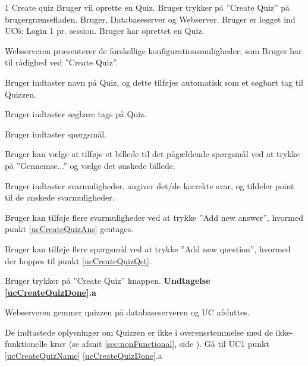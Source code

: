 
\uchead
	{1}
	{Create quiz}
	{Bruger vil oprette en Quiz.}
	{Bruger trykker på ''Create Quiz'' på brugergrænsefladen.}
	{Bruger, Databaseserver og Webserver.}
	{Bruger er logget ind} %
	{UC6: Login}
	{1 pr. session.}
	{Bruger har oprettet en Quiz.}

\item Webserveren præsenterer de forskellige konfigurationsmuligheder, som Bruger har til rådighed ved ''Create Quiz''.

\item \label{ucCreateQuizName} Bruger indtaster navn på Quiz, og dette tilføjes automatisk som et søgbart tag til Quizzen.

\item Bruger indtaster søgbare tags på Quiz.

\item \label{ucCreateQuizQst} Bruger indtaster spørgsmål.

\item Bruger kan vælge at tilføje et billede til det pågældende spørgsmål ved at trykke på ''Gennemse...'' og vælge det ønskede billede.

\item \label{ucCreateQuizAns} Bruger indtaster svarmuligheder, angiver det/de korrekte svar, og tildeler point til de ønskede svarmuligheder.

\item Bruger kan tilføje flere svarmuligheder ved at trykke ''Add new answer'', hvormed punkt \ref{ucCreateQuizAns} gentages.

\item Bruger kan tilføje flere spørgsmål ved at trykke ''Add new question'', hvormed der hoppes til punkt \ref{ucCreateQuizQst}.

\item \label{ucCreateQuizDone} Bruger trykker på ''Create Quiz'' knappen.
\textbf{Undtagelse \ref{ucCreateQuizDone}.a}

\item \label{ucCreateQuizDB} Webserveren gemmer quizzen på databaseserveren og UC afsluttes.

\ucdescriptionend

\ucextension
	{De indtastede oplysninger om Quizzen er ikke i overensstemmelse med de ikke-funktionelle krav (se afsnit \ref{sec:nonFunctional}, side \pageref{sec:nonFunctional}).}
	{Gå til UC1 punkt \ref{ucCreateQuizName}}
	{\ref{ucCreateQuizDone}.a}
		
